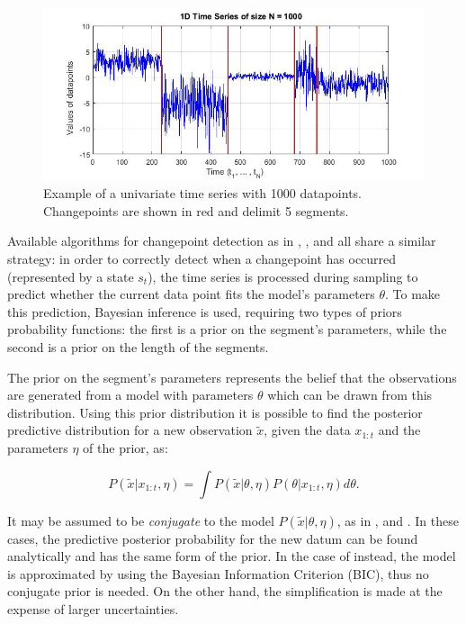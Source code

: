 \documentclass[11pt,twoside,a4paper]{report}
\begin{document}
\begin{figure}[h]
\centering
\includegraphics[width=.9\textwidth]{1d_series_1000_segments.jpg}
\caption{Example of a univariate time series with 1000 datapoints. Changepoints are shown in red and delimit 5 segments.}
\label{fig:timeseries}
\end{figure}

Available algorithms for changepoint detection as in \cite{adams}, \cite{fearn1}, \cite{fearn2} and \cite{champ} all share a similar strategy: in order to correctly detect when a changepoint has occurred (represented by a state $s_t$), the time series is processed during sampling to predict whether the current data point fits the model's parameters $\theta$. To make this prediction, Bayesian inference is used, requiring two types of priors probability functions: the first is a prior on the segment's parameters, while the second is a prior on the length of the segments.

The prior on the segment's parameters represents the belief that the observations are generated from a model with parameters $\theta$ which can be drawn from this distribution. Using this prior distribution it is possible to find the posterior predictive distribution for a new observation $\tilde{x}$, given the data $x_{1:t}$ and the parameters $\eta$ of the prior, as:

\begin{equation} \label{eq:priorPar}
P(\tilde{x} | x_{1:t}, \eta) = \int P(\tilde{x} | \theta, \eta) P(\theta | x_{1:t}, \eta) d\theta .
\end{equation}

It may be assumed to be \textit{conjugate} to the model $P(\tilde{x} | \theta, \eta)$, as in \cite{adams}, \cite{fearn1} and \cite{fearn2}. In these cases, the predictive posterior probability for the new datum can be found analytically and has the same form of the prior.
In the case of \cite{champ} instead, the model is approximated by using the Bayesian Information Criterion (BIC), thus no conjugate prior is needed. On the other hand, the simplification is made at the expense of larger uncertainties.
\end{document}
